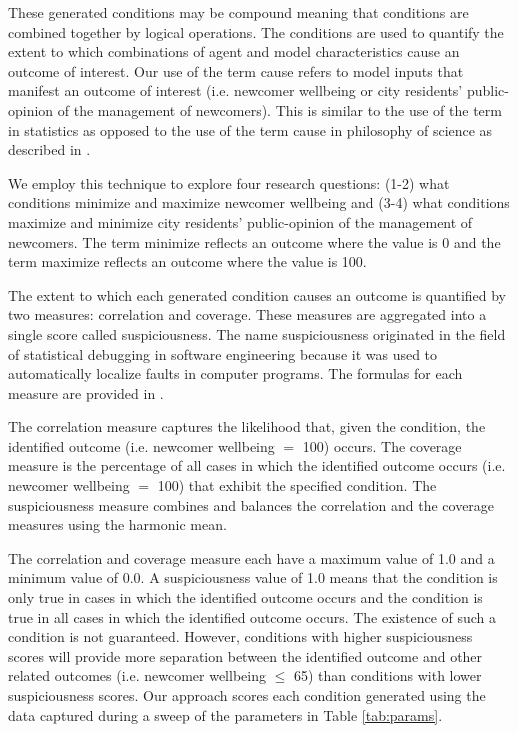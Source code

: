 \documentclass{scspaperproc}
\theoremstyle{scsthe}
\begin{document}
These generated conditions may be compound meaning that conditions are combined together by logical operations. The conditions are used to quantify the extent to which combinations of agent and model characteristics cause an outcome of interest. Our use of the term cause refers to model inputs that manifest an outcome of interest (i.e. newcomer wellbeing or city residents' public-opinion of the management of newcomers). This is similar to the use of the term in statistics \cite{cox1992causality} as opposed to the use of the term cause in philosophy of science as described in \cite{bunge2017causality}.

We employ this technique to explore four research questions: (1-2) what conditions minimize and maximize newcomer wellbeing and (3-4) what conditions maximize and minimize city residents' public-opinion of the management of newcomers.  The term minimize reflects an outcome where the value is 0 and the term maximize reflects an outcome where the value is 100.

The extent to which each generated condition causes an outcome is quantified by two measures: correlation and coverage. These measures are aggregated into a single score called suspiciousness. The name suspiciousness originated in the field of statistical debugging in software engineering because it was used to automatically localize faults in computer programs. The formulas for each measure are provided in \cite{diallo2016formal}.

The correlation measure captures the likelihood that, given the condition, the identified outcome (i.e. newcomer wellbeing $=$ 100) occurs. The coverage measure is the percentage of all cases in which the identified outcome occurs (i.e. newcomer wellbeing $=$ 100) that exhibit the specified condition. The suspiciousness measure combines and balances the correlation and the coverage measures using the harmonic mean.

The correlation and coverage measure each have a maximum value of 1.0 and a minimum value of 0.0. A suspiciousness value of 1.0 means that the condition is only true in cases in which the identified outcome occurs and the condition is true in all cases in which the identified outcome occurs. The existence of such a condition is not guaranteed. However, conditions with higher suspiciousness scores will provide more separation between the identified outcome and other related outcomes (i.e. newcomer wellbeing $\leq$ 65) than conditions with lower suspiciousness scores. Our approach scores each condition generated using the data captured during a sweep of the parameters in Table \ref{tab:params}.
\end{document}
